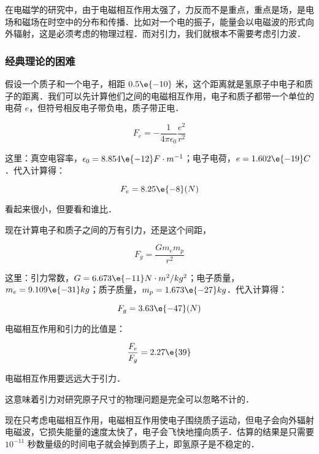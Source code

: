 在电磁学的研究中，由于电磁相互作用太强了，力反而不是重点，重点是场，是电场和磁场在时空中的分布和传播．比如对一个电的振子，能量会以电磁波的形式向外辐射，这是必须考虑的物理过程．而对引力，我们就根本不需要考虑引力波．

\subsubsection{经典理论的困难}

假设一个质子和一个电子，相距 $0.5\e{-10}$ 米，这个距离就是氢原子中电子和质子的距离．我们可以先计算他们之间的电磁相互作用，电子和质子都带一个单位的电荷 $e$，但符号相反电子带负电，质子带正电．

\begin{equation}
F_e = - \frac{1}{4 \pi \epsilon_0}\frac{e^2 }{r^2 }
\end{equation}

这里：真空电容率，$\epsilon_0 = 8.854\e{-12} F \cdot m^{-1}$；电子电荷，$e = 1.602\e{-19} C$．代入计算得：

\begin{equation}
F_e = 8.25\e{-8} (N)
\end{equation}

看起来很小，但要看和谁比．

现在计算电子和质子之间的万有引力，还是这个间距，

\begin{equation}
F_g = \frac{G m_e m_p }{r^2}
\end{equation}

这里：引力常数，$G = 6.673\e{-11} N \cdot m^2 / kg^2 $；电子质量，$m_e = 9.109\e{-31} kg $；质子质量，$m_p = 1.673 \e{-27 } kg  $．代入计算得：

\begin{equation}
F_g = 3.63\e{-47} (N)
\end{equation}


电磁相互作用和引力的比值是：

\begin{equation}
\frac{F_e}{ F_g } = 2.27\e{39}
\end{equation}

电磁相互作用要远远大于引力．

这意味着引力对研究原子尺寸的物理问题是完全可以忽略不计的．

现在只考虑电磁相互作用，电磁相互作用使电子围绕质子运动，但电子会向外辐射电磁波，它损失能量的速度太快了，电子会飞快地撞向质子．估算的结果是只需要 $10^{-11}$ 秒数量级的时间电子就会掉到质子上，即氢原子是不稳定的．

